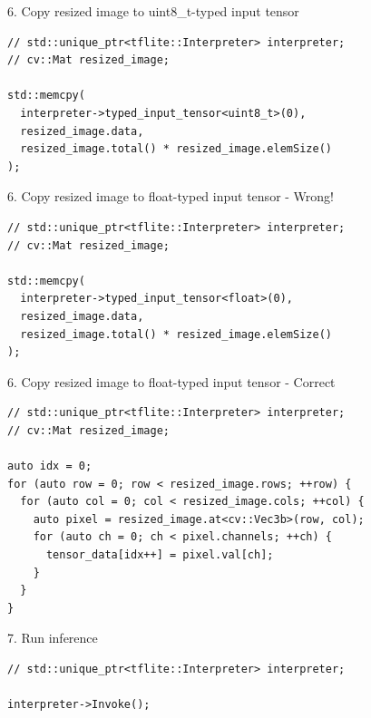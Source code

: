 \begin{frame}[fragile]{6. Copy resized image to uint8\_t-typed input tensor}
  \lstset{basicstyle=\ttfamily\small, numbers=left, columns=fullflexible}
  \begin{lstlisting}
// std::unique_ptr<tflite::Interpreter> interpreter;
// cv::Mat resized_image;

std::memcpy(
  interpreter->typed_input_tensor<uint8_t>(0),
  resized_image.data,
  resized_image.total() * resized_image.elemSize()
);
  \end{lstlisting}
\end{frame}

\begin{frame}[fragile]{6. Copy resized image to float-typed input tensor - Wrong!}
  \lstset{basicstyle=\ttfamily\small, numbers=left, columns=fullflexible}
  \begin{lstlisting}
// std::unique_ptr<tflite::Interpreter> interpreter;
// cv::Mat resized_image;

std::memcpy(
  interpreter->typed_input_tensor<float>(0),
  resized_image.data,
  resized_image.total() * resized_image.elemSize()
);
  \end{lstlisting}
\end{frame}

\begin{frame}[fragile]{6. Copy resized image to float-typed input tensor - Correct}
  \lstset{basicstyle=\ttfamily\small, numbers=left, columns=fullflexible}
  \begin{lstlisting}
// std::unique_ptr<tflite::Interpreter> interpreter;
// cv::Mat resized_image;

auto idx = 0;
for (auto row = 0; row < resized_image.rows; ++row) {
  for (auto col = 0; col < resized_image.cols; ++col) {
    auto pixel = resized_image.at<cv::Vec3b>(row, col);
    for (auto ch = 0; ch < pixel.channels; ++ch) {
      tensor_data[idx++] = pixel.val[ch];
    }
  }
}
  \end{lstlisting}
\end{frame}

\begin{frame}[fragile]{7. Run inference}
  \lstset{basicstyle=\ttfamily\small, numbers=left, columns=fullflexible}
  \begin{lstlisting}
// std::unique_ptr<tflite::Interpreter> interpreter;

interpreter->Invoke();
  \end{lstlisting}
\end{frame}

